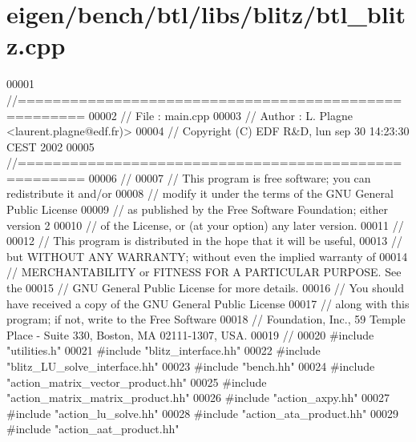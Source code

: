 \hypertarget{eigen_2bench_2btl_2libs_2blitz_2btl__blitz_8cpp_source}{}\section{eigen/bench/btl/libs/blitz/btl\+\_\+blitz.cpp}
\label{eigen_2bench_2btl_2libs_2blitz_2btl__blitz_8cpp_source}

\begin{DoxyCode}
00001 \textcolor{comment}{//=====================================================}
00002 \textcolor{comment}{// File   :  main.cpp}
00003 \textcolor{comment}{// Author :  L. Plagne <laurent.plagne@edf.fr)>}
00004 \textcolor{comment}{// Copyright (C) EDF R&D,  lun sep 30 14:23:30 CEST 2002}
00005 \textcolor{comment}{//=====================================================}
00006 \textcolor{comment}{//}
00007 \textcolor{comment}{// This program is free software; you can redistribute it and/or}
00008 \textcolor{comment}{// modify it under the terms of the GNU General Public License}
00009 \textcolor{comment}{// as published by the Free Software Foundation; either version 2}
00010 \textcolor{comment}{// of the License, or (at your option) any later version.}
00011 \textcolor{comment}{//}
00012 \textcolor{comment}{// This program is distributed in the hope that it will be useful,}
00013 \textcolor{comment}{// but WITHOUT ANY WARRANTY; without even the implied warranty of}
00014 \textcolor{comment}{// MERCHANTABILITY or FITNESS FOR A PARTICULAR PURPOSE.  See the}
00015 \textcolor{comment}{// GNU General Public License for more details.}
00016 \textcolor{comment}{// You should have received a copy of the GNU General Public License}
00017 \textcolor{comment}{// along with this program; if not, write to the Free Software}
00018 \textcolor{comment}{// Foundation, Inc., 59 Temple Place - Suite 330, Boston, MA  02111-1307, USA.}
00019 \textcolor{comment}{//}
00020 \textcolor{preprocessor}{#include "utilities.h"}
00021 \textcolor{preprocessor}{#include "blitz\_interface.hh"}
00022 \textcolor{preprocessor}{#include "blitz\_LU\_solve\_interface.hh"}
00023 \textcolor{preprocessor}{#include "bench.hh"}
00024 \textcolor{preprocessor}{#include "action\_matrix\_vector\_product.hh"}
00025 \textcolor{preprocessor}{#include "action\_matrix\_matrix\_product.hh"}
00026 \textcolor{preprocessor}{#include "action\_axpy.hh"}
00027 \textcolor{preprocessor}{#include "action\_lu\_solve.hh"}
00028 \textcolor{preprocessor}{#include "action\_ata\_product.hh"}
00029 \textcolor{preprocessor}{#include "action\_aat\_product.hh"}

\end{DoxyCode}
